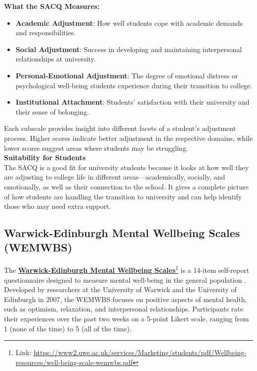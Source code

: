 \noindent \textbf{What the SACQ Measures:}
\begin{itemize}
    \item \textbf{Academic Adjustment}: How well students cope with academic demands and responsibilities.
    \item \textbf{Social Adjustment}: Success in developing and maintaining interpersonal relationships at university.
    \item \textbf{Personal-Emotional Adjustment}: The degree of emotional distress or psychological well-being students experience during their transition to college.
    \item \textbf{Institutional Attachment}: Students' satisfaction with their university and their sense of belonging.
\end{itemize}
Each subscale provides insight into different facets of a student’s adjustment process. Higher scores indicate better adjustment in the respective domains, while lower scores suggest areas where students may be struggling.\vspace{5mm} \\
\noindent \textbf{Suitability for Students} \\
The SACQ is a good fit for university students because it looks at how well they are adjusting to college life in different areas—academically, socially, and emotionally, as well as their connection to the school. It gives a complete picture of how students are handling the transition to university and can help identify those who may need extra support.

\subsection{Warwick-Edinburgh Mental Wellbeing Scales (WEMWBS)}

The \textbf{\href{https://www2.uwe.ac.uk/services/Marketing/students/pdf/Wellbeing-resources/well-being-scale-wemwbs.pdf}{Warwick-Edinburgh Mental Wellbeing Scales}}\footnote{Link: \url{https://www2.uwe.ac.uk/services/Marketing/students/pdf/Wellbeing-resources/well-being-scale-wemwbs.pdf}} is a 14-item self-report questionnaire designed to measure mental well-being in the general population \cite{wemwbs-review}. Developed by researchers at the University of Warwick and the University of Edinburgh in 2007, the WEMWBS focuses on positive aspects of mental health, such as optimism, relaxation, and interpersonal relationships. Participants rate their experiences over the past two weeks on a 5-point Likert scale, ranging from 1 (none of the time) to 5 (all of the time).\vspace{5mm}

